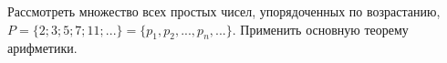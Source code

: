 Рассмотреть множество всех простых чисел, упорядоченных по возрастанию,
$
	P = \{2;3;5;7;11;...\} = \{p_1,p_2,...,p_n,...\}
$.
Применить основную теорему арифметики.
